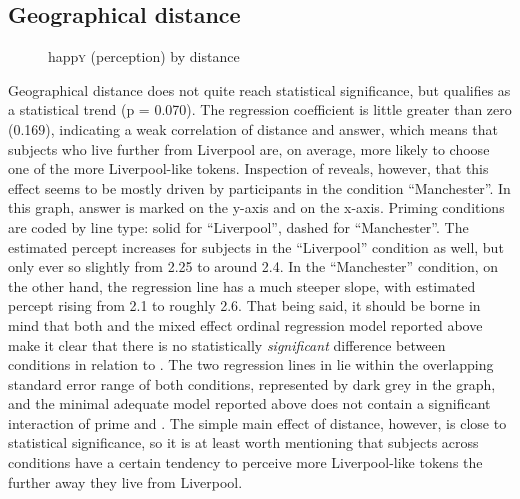 \subsection{Geographical distance}
\label{sec.perc_res.happy.geography}

\begin{figure}
	
		\resizebox{.49\linewidth}{!}{} 
	\caption{happ\textsc{y} (perception) by distance}
	\label{fig.scatter.happy.ext.dist}
\end{figure}

Geographical distance does not quite reach statistical significance, but qualifies as a statistical trend (p = 0.070).
The regression coefficient is little greater than zero (0.169), indicating a weak correlation of distance and answer, which means that subjects who live further from Liverpool are, on average, more likely to choose one of the more Liverpool-like tokens.
Inspection of  reveals, however, that this effect seems to be mostly driven by participants in the  condition ``Manchester''.
In this graph, answer is marked on the y-axis and  on the x-axis.
Priming conditions are coded by line type: solid for ``Liverpool'', dashed for ``Manchester''.
The estimated percept increases for subjects in the ``Liverpool'' condition as well, but only ever so slightly from 2.25 to around 2.4.
In the ``Manchester'' condition, on the other hand, the regression line has a much steeper slope, with estimated percept rising from 2.1 to roughly 2.6.
That being said, it should be borne in mind that both  and the mixed effect ordinal regression model reported above make it clear that there is no statistically \emph{significant} difference between  conditions in relation to .
The two regression lines in  lie within the overlapping standard error range of both conditions, represented by dark grey in the graph, and the minimal adequate model reported above does not contain a significant interaction of prime and .
The simple main effect of distance, however, is close to statistical significance, so it is at least worth mentioning that subjects across conditions have a certain tendency to perceive more Liverpool-like tokens the further away they live from Liverpool.

